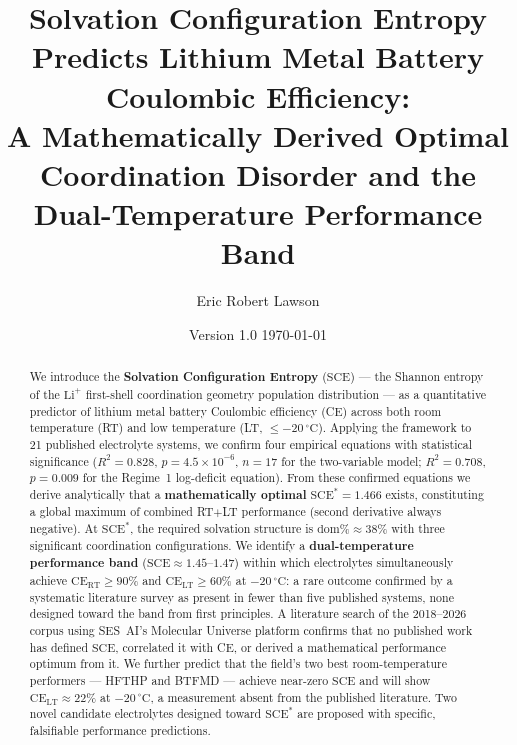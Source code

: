 \documentclass[12pt,letterpaper]{article}
\newcommand{\mSCE}{\mathrm{SCE}}
\newcommand{\mSCEstar}{\mathrm{SCE}^{*}}
\begin{document}
\title{\textbf{Solvation Configuration Entropy Predicts
Lithium Metal Battery Coulombic Efficiency:\\
A Mathematically Derived Optimal Coordination Disorder
and the Dual-Temperature Performance Band}}

\author[1]{Eric Robert Lawson}

\date{Version 1.0 \quad \today}

\maketitle
\thispagestyle{empty}

\begin{abstract}
We introduce the \textbf{Solvation Configuration Entropy}
($\mSCE$) --- the Shannon entropy of the
$\mathrm{Li}^{+}$ first-shell coordination geometry
population distribution --- as a quantitative predictor
of lithium metal battery Coulombic efficiency (CE) across
both room temperature (RT) and low temperature
(LT, $\leq -20\,^{\circ}\mathrm{C}$).
Applying the framework to 21 published electrolyte systems,
we confirm four empirical equations with statistical
significance ($R^{2} = 0.828$,
$p = 4.5 \times 10^{-6}$, $n = 17$
for the two-variable model;
$R^{2} = 0.708$, $p = 0.009$
for the Regime~1 log-deficit equation).
From these confirmed equations we derive analytically that a
\textbf{mathematically optimal} $\mSCEstar = 1.466$ exists,
constituting a global maximum of combined RT$+$LT performance
(second derivative always negative).
At $\mSCEstar$, the required solvation structure is
$\mathrm{dom\%} \approx 38\%$ with three significant
coordination configurations.
We identify a \textbf{dual-temperature performance band}
($\mSCE \approx 1.45$--$1.47$) within which electrolytes
simultaneously achieve
$\mathrm{CE}_{\mathrm{RT}} \geq 90\%$ and
$\mathrm{CE}_{\mathrm{LT}} \geq 60\%$
at $-20\,^{\circ}\mathrm{C}$:
a rare outcome confirmed by a systematic literature survey
as present in fewer than five published systems,
none designed toward the band from first principles.
A literature search of the 2018--2026 corpus using
SES~AI's Molecular Universe platform confirms that no
published work has defined $\mSCE$, correlated it with CE,
or derived a mathematical performance optimum from it.
We further predict that the field's two best
room-temperature performers --- HFTHP and BTFMD ---
achieve near-zero $\mSCE$ and will show
$\mathrm{CE}_{\mathrm{LT}} \approx 22\%$
at $-20\,^{\circ}\mathrm{C}$,
a measurement absent from the published literature.
Two novel candidate electrolytes designed toward
$\mSCEstar$ are proposed with specific,
falsifiable performance predictions.
\end{abstract}
\end{document}
